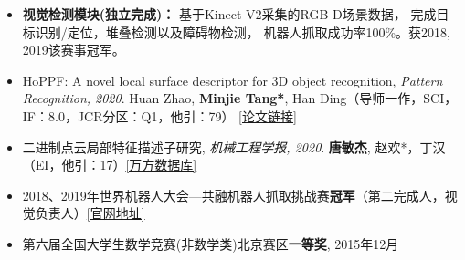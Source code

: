 \begin{itemize}[topsep=0pt, left=1em]
  \item \textbf{视觉检测模块(独立完成)：}
  基于Kinect-V2采集的RGB-D场景数据，
  完成目标识别/定位，堆叠检测以及障碍物检测，
  机器人抓取成功率100\%。获2018, 2019该赛事冠军。 
\end{itemize}

\begin{itemize}[parsep=0.5ex, label=]
  \item HoPPF: A novel local surface descriptor for 3D object recognition, 
  \textit{Pattern Recognition, 2020}. Huan Zhao, \textbf{Minjie Tang*}, 
  Han Ding（导师一作，SCI，IF：8.0，JCR分区：Q1，他引：79）
\href{https://www.sciencedirect.com/science/article/abs/pii/S0031320320300777}{[论文链接]} 
  \item 二进制点云局部特征描述子研究, \textit{机械工程学报, 2020}. \textbf{唐敏杰}, 赵欢*，丁汉（EI，他引：17）\href{https://s.wanfangdata.com.cn/paper?q=%E4%BD%9C%E8%80%85%3A%22%E5%94%90%E6%95%8F%E6%9D%B0%22%20%E4%BD%9C%E8%80%85%E5%8D%95%E4%BD%8D%3A%20%22%E5%8D%8E%E4%B8%AD%E7%A7%91%E6%8A%80%E5%A4%A7%E5%AD%A6%22}{[万方数据库]} 
  \item 2018、2019年世界机器人大会—共融机器人抓取挑战赛\textbf{冠军}（第二完成人，视觉负责人）\href{https://www.worldrobotconference.com/cn/view/1129.html}{[官网地址]}  
  \item 第六届全国大学生数学竞赛(非数学类)北京赛区\textbf{一等奖}, 2015年12月
\end{itemize}







